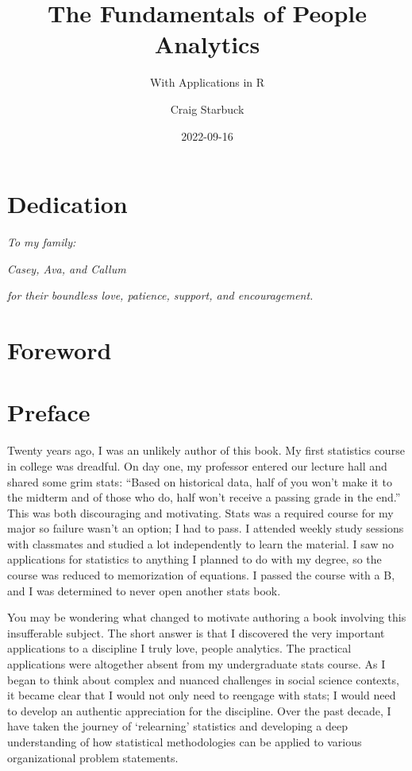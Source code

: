 \documentclass[
]{book}
\title{The Fundamentals of People Analytics}
\subtitle{With Applications in R}
\author{Craig Starbuck}
\date{2022-09-16}
\begin{document}
\maketitle

{
\setcounter{tocdepth}{1}
\tableofcontents
}
\hypertarget{dedication}{%
\chapter*{Dedication}\label{dedication}}

\emph{To my family:}

\emph{Casey, Ava, and Callum}

\emph{for their boundless love, patience, support, and encouragement.}

\hypertarget{foreword}{%
\chapter*{Foreword}\label{foreword}}

\hypertarget{preface}{%
\chapter*{Preface}\label{preface}}

Twenty years ago, I was an unlikely author of this book. My first statistics course in college was dreadful. On day one, my professor entered our lecture hall and shared some grim stats: ``Based on historical data, half of you won't make it to the midterm and of those who do, half won't receive a passing grade in the end.'' This was both discouraging and motivating. Stats was a required course for my major so failure wasn't an option; I had to pass. I attended weekly study sessions with classmates and studied a lot independently to learn the material. I saw no applications for statistics to anything I planned to do with my degree, so the course was reduced to memorization of equations. I passed the course with a B, and I was determined to never open another stats book.

You may be wondering what changed to motivate authoring a book involving this insufferable subject. The short answer is that I discovered the very important applications to a discipline I truly love, people analytics. The practical applications were altogether absent from my undergraduate stats course. As I began to think about complex and nuanced challenges in social science contexts, it became clear that I would not only need to reengage with stats; I would need to develop an authentic appreciation for the discipline. Over the past decade, I have taken the journey of `relearning' statistics and developing a deep understanding of how statistical methodologies can be applied to various organizational problem statements.
\end{document}
